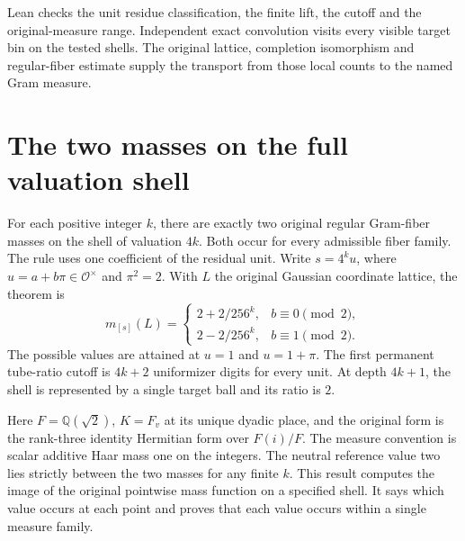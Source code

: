\documentclass[12pt,letterpaper]{article}
\begin{document}
\par
Lean checks the unit residue classification, the finite lift, the cutoff and the original-measure range. Independent exact convolution visits every visible target bin on the tested shells. The original lattice, completion isomorphism and regular-fiber estimate supply the transport from those local counts to the named Gram measure.
\clearpage
\makeatletter
\begingroup\small\setlength{\parskip}{0pt}
\renewcommand*{\l@section}[2]{\addvspace{3pt}\@dottedtocline{1}{0em}{1.9em}{#1}{#2}}
\tableofcontents\endgroup
\makeatother
\clearpage{}
\section{The two masses on the full valuation shell}
\label{sec:unit-classification}
For each positive integer $k$, there are exactly two original regular Gram-fiber masses on the shell of valuation $4k$. Both occur for every admissible fiber family. The rule uses one coefficient of the residual unit. Write $s=4^k u$, where $u=a+b\pi\in\mathcal O^\times$ and $\pi^2=2$. With $L$ the original Gaussian coordinate lattice, the theorem is
\[
m_{[s]}(L)=
\begin{cases}
2+2/256^k,& b\equiv 0\pmod2,\\
2-2/256^k,& b\equiv 1\pmod2.
\end{cases}
\]
The possible values are attained at $u=1$ and $u=1+\pi$. The first permanent tube-ratio cutoff is $4k+2$ uniformizer digits for every unit. At depth $4k+1$, the shell is represented by a single target ball and its ratio is $2$.

Here $F=\mathbb Q(\sqrt2)$, $K=F_v$ at its unique dyadic place, and the original form is the rank-three identity Hermitian form over $F(i)/F$. The measure convention is scalar additive Haar mass one on the integers. The neutral reference value two lies strictly between the two masses for any finite $k$. This result computes the image of the original pointwise mass function on a specified shell. It says which value occurs at each point and proves that each value occurs within a single measure family.
\end{document}
